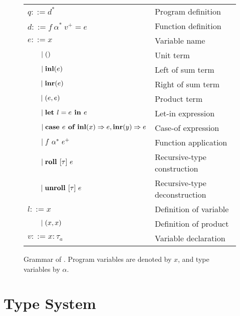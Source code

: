 \begin{figure}[t]
\begin{tabular}{p{}l}
$q ::= d^*$                                             & Program definition\\
$d ::= f\ \alpha^*~v^+ = e$                             & Function definition\\
$e ::= x$                                               & Variable name\\
$\hspace{1.9em}\mid ()$                                 & Unit term\\
$\hspace{1.9em}\mid \textbf{inl}(e)$                            & Left of sum term\\
$\hspace{1.9em}\mid \textbf{inr}(e)$                            & Right of sum term\\
$\hspace{1.9em}\mid (e, e)$                             & Product term\\
$\hspace{1.9em}\mid \textbf{let } l = e \textbf{ in } e$                     & Let-in expression \\
$\hspace{1.9em}\mid \textbf{case } e \textbf{ of } \textbf{inl}(x) \Rightarrow e, \textbf{inr}(y) \Rightarrow e$ & Case-of expression\\
$\hspace{1.9em}\mid f~\alpha^*~e^+$                     & Function application\\
$\hspace{1.9em}\mid \textbf{roll } [\tau]\ e$                     & Recursive-type construction \\
$\hspace{1.9em}\mid \textbf{unroll } [\tau]\ e$                   & Recursive-type deconstruction\\
$l ::= x$                                               & Definition of variable\\
$\hspace{1.9em}\mid (x, x)$                             & Definition of product \\
$v ::= x:\tau_a$                                        & Variable declaration
\end{tabular}

\caption{Grammar of \rfunc. Program variables are denoted by $x$, and type
variables by $\alpha$.}\label{fig:grammar}
\end{figure}

\section{Type System}


